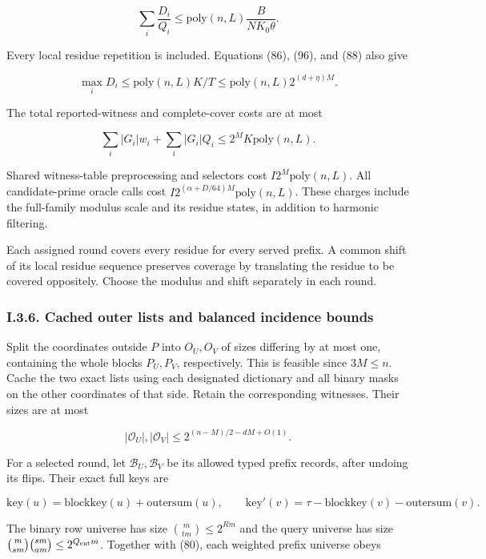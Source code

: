 \[
\boxed{\sum_i\frac{D_i}{Q_i}
\le\mathrm{poly}(n,L)\frac{B}{NK_0\theta}.}
\tag{103}
\]

Every local residue repetition is included. Equations (86), (96), and (88) also give

\[
\max_iD_i\le\mathrm{poly}(n,L)K/T
\le\mathrm{poly}(n,L)2^{(d+\eta)M}.
\]

The total reported-witness and complete-cover costs are at most

\[
\sum_i|G_i|w_i+\sum_i|G_i|Q_i
\le 2^M K\mathrm{poly}(n,L).
\tag{104}
\]

Shared witness-table preprocessing and selectors cost \(I2^M\mathrm{poly}(n,L)\). All candidate-prime oracle calls cost \(I2^{(\alpha+D/64)M}\mathrm{poly}(n,L)\). These charges include the full-family modulus scale and its residue states, in addition to harmonic filtering.

Each assigned round covers every residue for every served prefix. A common shift of its local residue sequence preserves coverage by translating the residue to be covered oppositely. Choose the modulus and shift separately in each round.

\hypertarget{af-a9ec399514-i.3.6.-cached-outer-lists-and-balanced-incidence-bounds}{%
\subsubsection{I.3.6. Cached outer lists and balanced incidence bounds}\label{af-a9ec399514-i.3.6.-cached-outer-lists-and-balanced-incidence-bounds}}

Split the coordinates outside \(P\) into \(O_U,O_V\) of sizes differing by at most one, containing the whole blocks \(P_U,P_V\), respectively. This is feasible since \(3M\le n\). Cache the two exact lists using each designated dictionary and all binary masks on the other coordinates of that side. Retain the corresponding witnesses. Their sizes are at most

\[
|\mathcal O_U|,|\mathcal O_V|
\le2^{(n-M)/2-dM+O(1)}.
\tag{105}
\]

For a selected round, let \(\mathcal B_U,\mathcal B_V\) be its allowed typed prefix records, after undoing its flips. Their exact full keys are

\[
\mathrm{key}(u)=\mathrm{blockkey}(u)+\mathrm{outersum}(u),
\qquad
\mathrm{key}'(v)=\tau-\mathrm{blockkey}(v)-\mathrm{outersum}(v).
\tag{106}
\]

The binary row universe has size \(\binom m{tm}\le2^{Rm}\) and the query universe has size \(\binom m{sm}\binom{sm}{am}\le2^{Q_{\rm ent}m}\). Together with (80), each weighted prefix universe obeys

